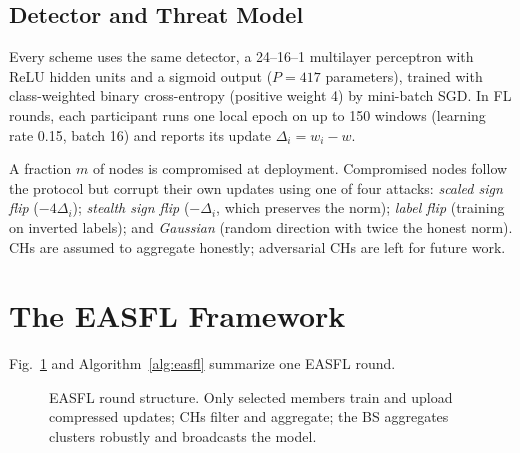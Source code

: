 \documentclass[journal,onecolumn,draftclsnofoot,12pt]{IEEEtran}
\begin{document}
\subsection{Detector and Threat Model}
Every scheme uses the same detector, a 24--16--1 multilayer perceptron with ReLU hidden units and a sigmoid output ($P=417$ parameters), trained with class-weighted binary cross-entropy (positive weight 4) by mini-batch SGD. In FL rounds, each participant runs one local epoch on up to 150 windows (learning rate 0.15, batch 16) and reports its update $\Delta_i=w_i-w$.

A fraction $m$ of nodes is compromised at deployment. Compromised nodes follow the protocol but corrupt their own updates using one of four attacks: \emph{scaled sign flip} ($-4\Delta_i$); \emph{stealth sign flip} ($-\Delta_i$, which preserves the norm); \emph{label flip} (training on inverted labels); and \emph{Gaussian} (random direction with twice the honest norm). CHs are assumed to aggregate honestly; adversarial CHs are left for future work.

\section{The EASFL Framework}\label{sec:method}
Fig.~\ref{fig:arch} and Algorithm~\ref{alg:easfl} summarize one EASFL round.

\begin{figure}[t]
\centering
{}
\caption{EASFL round structure. Only selected members train and upload compressed updates; CHs filter and aggregate; the BS aggregates clusters robustly and broadcasts the model.}
\label{fig:arch}
\end{figure}
\end{document}
